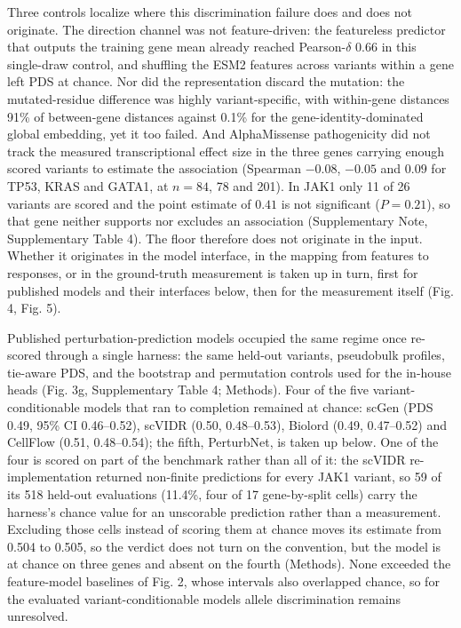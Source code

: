 \documentclass[11pt,letterpaper]{article}
\begin{document}
Three controls localize where this discrimination failure does and does not originate. The direction channel was not feature-driven: the featureless predictor that outputs the training gene mean already reached Pearson-$\delta$ 0.66 in this single-draw control, and shuffling the ESM2 features across variants within a gene left PDS at chance. Nor did the representation discard the mutation: the mutated-residue difference was highly variant-specific, with within-gene distances 91\% of between-gene distances against 0.1\% for the gene-identity-dominated global embedding, yet it too failed. And AlphaMissense pathogenicity did not track the measured transcriptional effect size in the three genes carrying enough scored variants to estimate the association (Spearman $-0.08$, $-0.05$ and $0.09$ for TP53, KRAS and GATA1, at $n = 84$, 78 and 201). In JAK1 only 11 of 26 variants are scored and the point estimate of $0.41$ is not significant ($P = 0.21$), so that gene neither supports nor excludes an association (Supplementary Note, Supplementary Table 4). The floor therefore does not originate in the input. Whether it originates in the model interface, in the mapping from features to responses, or in the ground-truth measurement is taken up in turn, first for published models and their interfaces below, then for the measurement itself (Fig. 4, Fig. 5).

Published perturbation-prediction models occupied the same regime once re-scored through a single harness: the same held-out variants, pseudobulk profiles, tie-aware PDS, and the bootstrap and permutation controls used for the in-house heads (Fig. 3g, Supplementary Table 4; Methods). Four of the five variant-conditionable models that ran to completion remained at chance: scGen (PDS 0.49, 95\% CI 0.46--0.52), scVIDR (0.50, 0.48--0.53), Biolord (0.49, 0.47--0.52) and CellFlow (0.51, 0.48--0.54); the fifth, PerturbNet, is taken up below. One of the four is scored on part of the benchmark rather than all of it: the scVIDR re-implementation returned non-finite predictions for every JAK1 variant, so 59 of its 518 held-out evaluations (11.4\%, four of 17 gene-by-split cells) carry the harness's chance value for an unscorable prediction rather than a measurement. Excluding those cells instead of scoring them at chance moves its estimate from 0.504 to 0.505, so the verdict does not turn on the convention, but the model is at chance on three genes and absent on the fourth (Methods). None exceeded the feature-model baselines of Fig. 2, whose intervals also overlapped chance, so for the evaluated variant-conditionable models allele discrimination remains unresolved.
\end{document}
